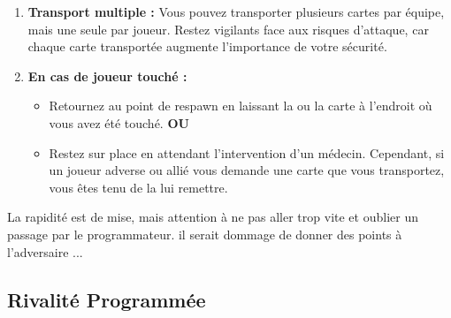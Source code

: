 \documentclass{template}
\begin{document}
\begin{enumerate}
    \item \textbf{Transport multiple :} Vous pouvez transporter plusieurs cartes par équipe, mais une seule par joueur. Restez vigilants face aux risques d’attaque, car chaque carte transportée augmente l’importance de votre sécurité.
    \item \textbf{En cas de joueur touché :}
    \begin{itemize}
        \item Retournez au point de respawn en laissant la ou la carte à l’endroit où vous avez été touché.\newline
        \textbf{OU}
        \item Restez sur place en attendant l’intervention d’un médecin. Cependant, si un joueur adverse ou allié vous demande une carte que vous transportez, vous êtes tenu de la lui remettre.
    \end{itemize}
\end{enumerate}

La rapidité est de mise, mais attention à ne pas aller trop vite et oublier un passage par le programmateur. il serait dommage de donner des points à l'adversaire ...

\subsection{Rivalité Programmée}  %
\end{document}
